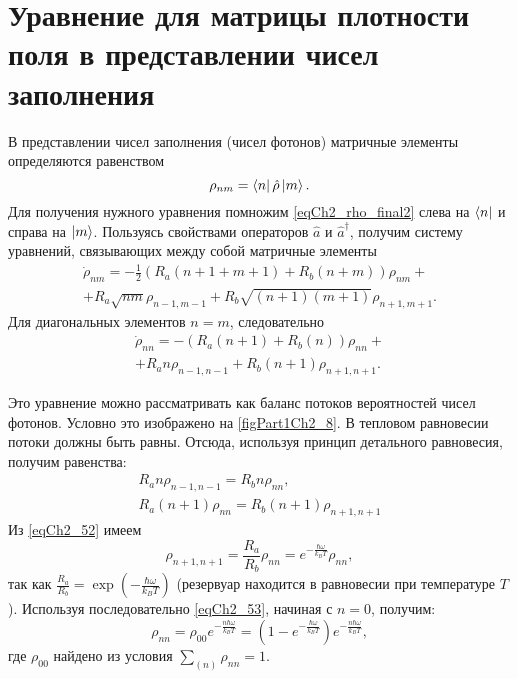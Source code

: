 \section{Уравнение для матрицы плотности поля в представлении чисел
  заполнения}
\label{ch2_7}
В представлении чисел заполнения (чисел фотонов) матричные элементы
определяются равенством
\[
\rho_{nm} = \bra{n}\hat{\rho}\ket{m}.
\]
Для получения нужного уравнения помножим
\eqref{eqCh2_rho_final2} слева на $\bra{n}$ и справа на  
$\ket{m}$.  Пользуясь
свойствами операторов $\hat{a}$ и $\hat{a}^{\dag}$,  получим систему
уравнений, связывающих между собой матричные элементы 
\begin{eqnarray}
\dot{\rho}_{nm} = - \frac{1}{2}
\left(
R_a\left(n + 1 + m + 1\right) + 
R_b\left(n + m\right)
\right)\rho_{nm} +
\nonumber \\
+ 
R_a\sqrt{nm}\rho_{n - 1, m - 1} +
R_b\sqrt{\left(n + 1\right)\left(m + 1\right)}\rho_{n + 1, m + 1}.
\label{eqCh2_task5}
\end{eqnarray}
Для диагональных элементов $n = m$,  следовательно
\begin{eqnarray}
\dot{\rho}_{nn} = - 
\left(
R_a\left(n + 1\right) + 
R_b\left(n\right)
\right)\rho_{nn} +
\nonumber \\
+ 
R_a n \rho_{n - 1, n - 1} +
R_b\left(n + 1\right)\rho_{n + 1, n + 1}.
\label{eqCh2_51}
\end{eqnarray}



Это уравнение можно рассматривать как баланс потоков вероятностей
чисел фотонов. Условно это изображено на \autoref{figPart1Ch2_8}. В
тепловом равновесии потоки должны быть равны. Отсюда, используя
принцип детального равновесия, получим равенства: 
\begin{eqnarray}
R_a n \rho_{n - 1, n - 1} = R_b n \rho_{nn},
\nonumber \\
R_a \left(n + 1\right) \rho_{n n} = R_b 
\left(n + 1\right) \rho_{n + 1, n + 1}
\label{eqCh2_52}
\end{eqnarray}
Из \eqref{eqCh2_52} имеем
\begin{equation}
\rho_{n + 1, n + 1} = \frac{R_a}{R_b}\rho_{nn} = 
e^{-\frac{\hbar \omega}{k_B T}}\rho_{nn},
\label{eqCh2_53}
\end{equation}
так как  
\(
\frac{R_a}{R_b} = 
\exp \left(-\frac{\hbar \omega}{k_B T}\right)
\)
(резервуар находится в равновесии при температуре
$T$). Используя последовательно \eqref{eqCh2_53}, начиная с  $n = 0$, 
получим:  
\begin{equation}
\rho_{nn} = \rho_{00} 
e^{-\frac{n \hbar \omega}{k_B T}} =
\left(1 - e^{-\frac{\hbar \omega}{k_B T}}\right) 
e^{-\frac{n \hbar \omega}{k_B T}},
\end{equation}
где $\rho_{00}$ найдено из условия $\sum_{(n)}\rho_{nn} = 1$.

